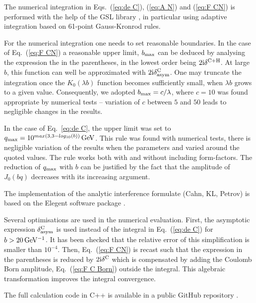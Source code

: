 \documentclass[pdftex,twocolumn,epjc3]{svjour3}
\def\un#1{\,{\rm #1}}
\def\I{{\rm i}}
\begin{document}
The numerical integration in Eqs.~(\ref{eq:de C}), (\ref{eq:A N}) and (\ref{eq:F CN}) is performed with the help of the GSL library \cite{gsl}, in particular using adaptive integration based on 61-point Gauss-Kronrod rules.

For the numerical integration one needs to set reasonable boundaries. In the case of Eq.~(\ref{eq:F CN}) a reasonable upper limit, $b_{\rm max}$ can be deduced by analysing the expression the in the parentheses, in the lowest order being $2\I\delta^{\rm C+H}$. At large $b$, this function can well be approximated with $2\I\delta^{\rm C}_{\rm asym}$. One may truncate the integration once the $K_0(\lambda b)$ function becomes sufficiently small, when $\lambda b$ grows to a given value. Consequently, we adopted $b_{\rm max} = c / \lambda$, where $c = 10$ was found appropriate by numerical tests -- variation of $c$ between $5$ and $50$ leads to negligible changes in the results.

In the case of Eq.~\ref{eq:de C}, the upper limit was set to $q_{\rm max} = 10^{max(3, 3 - log_{10}(b))} \un{GeV}$. This rule was found with numerical tests, there is negligible variation of the results when the parameters and varied around the quoted values. The rule works both with and without including form-factors. The reduction of $q_{\rm max}$ with $b$ can be justified by the fact that the amplitude of $J_0(bq)$ decreases with its increasing argument.

The implementation of the analytic interference formulate (Cahn, KL, Petrov) is based on the Elegent software package \cite{elegent}.

Several optimisations are used in the numerical evaluation. First, the asymptotic expression $\delta^{\rm C}_{\rm asym}$ is used instead of the integral in Eq.~(\ref{eq:de C}) for $b > 20\un{GeV^{-1}}$. It has been checked that the relative error of this simplification is smaller than $10^{-4}$. Then, Eq.~(\ref{eq:F CN}) is recast such that the expression in the parentheses is reduced by $2\I\delta^{\rm C}$ which is compensated by adding the Coulomb Born amplitude, Eq.~(\ref{eq:F C Born}) outside the integral. This algebraic transformation improves the integral convergence.

The full calculation code in C++ is available in a public GitHub repository \cite{code}.



\end{document}
